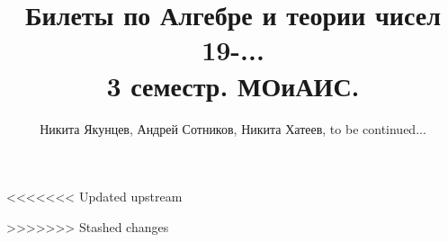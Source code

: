\documentclass[a4paper,12pt,oneside,titlepage]{article}
\title{Билеты по Алгебре и теории чисел 19-...\\ 3 семестр. МОиАИС.}
\author{Никита Якунцев, Андрей Сотников, Никита Хатеев, to be continued...}
\begin{document}
\maketitle
\tableofcontents

\theoremstyle{plain}
\newtheorem{theorem}{Теорема}
\newtheorem{lemma}{Лемма}

\theoremstyle{definition}
\newtheorem{definition}{Определение}

\renewcommand{\proofname}{
\textbf{Доказательство: }
}





<<<<<<< Updated upstream




%
%
%

%

>>>>>>> Stashed changes
\end{document}
